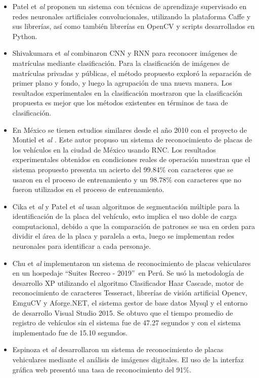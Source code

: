 \begin{itemize}
    \item Patel et \textit{al} \cite{patel2013automatic} proponen un sistema con técnicas de aprendizaje supervisado en redes neuronales artificiales convolucionales, utilizando la plataforma Caffe y sus librerías, así como también librerías en OpenCV y scripts desarrollados en Python.
    \item Shivakumara et \textit{al} \cite{shivakumara2018cnn} combinaron CNN y RNN para reconocer imágenes de matrículas mediante clasificación. Para la clasificación de imágenes de matrículas privadas y públicas, el método propuesto exploró la separación de primer plano y fondo, y luego la agrupación de una nueva manera. Los resultados experimentales en la clasificación mostraron que la clasificación propuesta es mejor que los métodos existentes en términos de tasa de clasificación.
    \item En México se tienen estudios similares desde el año 2010 con el proyecto de Montiel et \textit{al} \cite{montiel2010reconocimiento}. Este autor propuso un sistema de reconocimiento de placas de los vehículos en la ciudad de México usando RNC. Los resultados experimentales obtenidos en condiciones reales de operación muestran que el sistema propuesto presenta un acierto del 99.84\% con caracteres que se usaron en el proceso de entrenamiento y un 98.78\% con caracteres que no fueron utilizados en el proceso de entrenamiento.
    \item Cika et \textit{al} \cite{cika2011detection} y Patel et \textit{al} \cite{patel2013automatic} usan algoritmos de segmentación múltiple para la identificación de la placa del vehículo, esto implica el uso doble de carga computacional, debido a que la comparación de patrones se usa en orden para dividir el área de la placa y paralela a esta, luego se implementan redes neuronales para identificar a cada personaje.
    \item Chu et \textit{al} \cite{chu2019sistema} implementaron un sistema de reconocimiento de placas vehiculares en un hospedaje ``Suites Recreo - 2019”\ en Perú. Se usó la metodología de desarrollo XP utilizando el algoritmo Clasificador Haar Cascade, motor de reconocimiento de caracteres Tesseract, librerías de visión artificial Opencv, EmguCV y Aforge.NET, el sistema gestor de base datos Mysql y el entorno de desarrollo Visual Studio 2015. Se obtuvo que el tiempo promedio de registro de vehículos sin el sistema fue de 47.27 segundos y con el sistema implementado fue de 15.10 segundos.
    \item Espinoza et \textit{al} \cite{espinoza2015desarrollo} desarrollaron un sistema de reconocimiento de placas vehiculares mediante el análisis de imágenes digitales. El uso de la interfaz gráfica web presentó una tasa de reconocimiento del 91\%.

\end{itemize}
